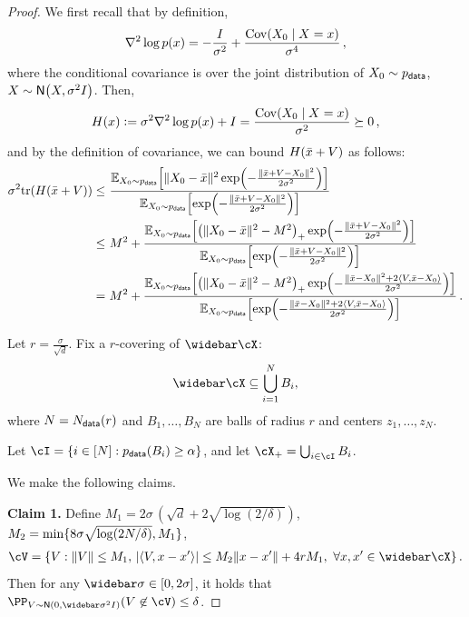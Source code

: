 \begin{proof}
We first recall that by definition,
\begin{align*}
    \nabla^2 \log p(x)=-\frac{I}{\sigma^2}+
    \frac{\mathrm{Cov}(X_0\mid X=x)}{\sigma^4}\,,
\end{align*}
where the conditional covariance is over the joint distribution of $X_0\sim p_{\mathsf{data}}$, $X\sim \normal{X,\sigma^2\Id}$. Then,
\begin{align*}
    H(x)\vcentcolon= \sigma^2\nabla^2 \log p(x)+I=\frac{\mathrm{Cov}(X_0\mid X=x)}{\sigma^2}\succeq 0\,,
\end{align*}
and by the definition of covariance, we can bound $H(\bar{x}+V)$ as follows:
\begin{align}\label{pfeq:tr-Hessian}
    \begin{aligned}
    \sigma^2 \tr(H(\xbar+V))
    \leq&~ \frac{\En_{X_0\sim \pdata}\brk*{ \nrm{X_0-\xbar}^2\exp\prn*{-\frac{\nrm{\xbar+V-X_0}^2}{2\sigma^2}} }}{\En_{X_0\sim \pdata}\brk*{ \exp\prn*{-\frac{\nrm{\xbar+V-X_0}^2}{2\sigma^2}} }} \\
    \leq&~ M^2+\frac{\En_{X_0\sim \pdata}\brk*{ \prn*{\nrm{X_0-\xbar}^2-M^2}_+\exp\prn*{-\frac{\nrm{\xbar+V-X_0}^2}{2\sigma^2}} }}{\En_{X_0\sim \pdata}\brk*{ \exp\prn*{-\frac{\nrm{\xbar+V-X_0}^2}{2\sigma^2}} }} \\
    =&~ M^2+\frac{\En_{X_0\sim \pdata}\brk*{ \prn*{\nrm{X_0-\xbar}^2-M^2}_+\exp\prn*{-\frac{\nrm{\xbar-X_0}^2+2\tri{V,\xbar-X_0}}{2\sigma^2}} }}{\En_{X_0\sim \pdata}\brk*{ \exp\prn*{-\frac{\nrm{\xbar-X_0}^2+2\tri{V,\xbar-X_0}}{2\sigma^2}} }}\,.
    \end{aligned}
\end{align}

Let $r=\frac{\sigma}{\sqrt{d}}$.
Fix a $r$-covering of $\cXbar$:
\begin{align*}
    \cXbar\subseteq \bigcup_{i=1}^N B_i,
\end{align*}
where $N=N_{\mathsf{data}}(r)$ and $B_1,\dotsc, B_N$ are balls of radius $r$ and centers $z_1,\dotsc,z_N$. 

Let $\cI=\crl{i\in[N]: \pdata(B_i)\geq \alpha}$, and let $\cX_+=\bigcup_{i\in\cI} B_i$.

We make the following claims.

\textbf{Claim 1.} Define $M_1=2\sigma\,(\sqrt{d}+2\sqrt{\log(2/\delta)})$, $M_2=\min\{8\sigma \sqrt{\log(2N/\delta)},M_1\}$,
\begin{align*}
    \cV=\crl{V: \nrm{V}\leq M_1,\, \abs{\tri{V,x-x'}}\leq M_2\nrm{x-x'}+4rM_1,~\forall x,x'\in\cXbar}\,.
\end{align*}
Then for any $\sigbar\in[0,2\sigma]$, it holds that $\PP_{V\sim \normal{0,\sigbar^2\Id}}(V\not \in \cV)\leq \delta$.


\end{proof}
